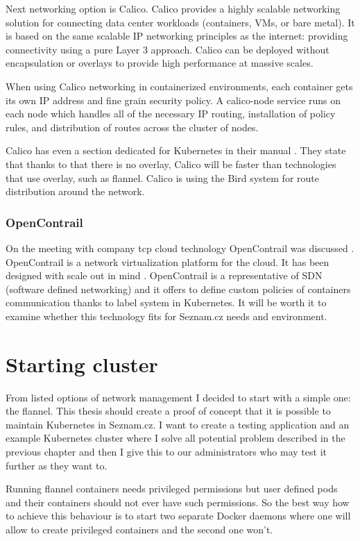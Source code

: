 Next networking option is Calico. Calico provides a highly scalable networking solution for connecting data center workloads (containers, VMs, or bare metal). It is based on the same scalable IP networking principles as the internet: providing connectivity using a pure Layer 3 approach. Calico can be deployed without encapsulation or overlays to provide high performance at massive scales.

When using Calico networking in containerized environments, each container gets its own IP address and fine grain security policy. A calico-node service runs on each node which handles all of the necessary IP routing, installation of policy rules, and distribution of routes across the cluster of nodes.  \cite{calico}

Calico has even a section dedicated for Kubernetes in their manual \cite{calico-kubernetes}. They state that thanks to that there is no overlay, Calico will be faster than technologies that use overlay, such as flannel. Calico is using the Bird \cite{bird} system for route distribution around the network.

\subsubsection{OpenContrail} 

On the meeting with company tcp cloud \cite{tcpcloud} technology OpenContrail was discussed \cite{tcpcloud-opencontrail}. OpenContrail is a network virtualization platform for the cloud. It has been designed with scale out in mind  \cite{opencontrail}. OpenContrail is a representative of SDN (software defined networking) and it offers to define custom policies of containers communication thanks to label system in Kubernetes. It will be worth it to examine whether this technology fits for Seznam.cz needs and environment.

\section{Starting cluster}
From listed options of network management I decided to start with a simple one: the flannel. This thesis should create a proof of concept that it is possible to maintain Kubernetes in Seznam.cz. I want to create a testing application and an example Kubernetes cluster where I solve all potential problem described in the previous chapter and then I give this to our administrators who may test it further as they want to.

Running flannel containers needs privileged permissions but user defined pods and their containers should not ever have such permissions. So the best way how to achieve this behaviour is to start two separate Docker daemons where one will allow to create privileged containers and the second one won’t.


